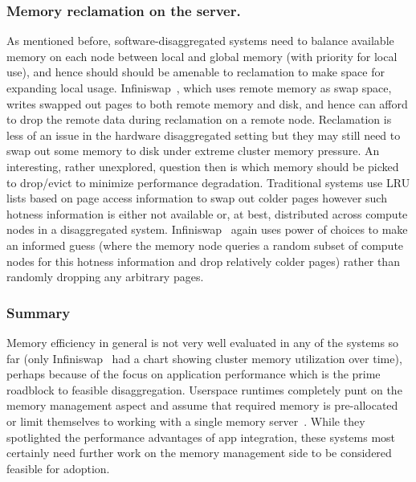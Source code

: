 \subsubsection{Memory reclamation on the server.}
As mentioned before, software-disaggregated systems need to 
balance available memory on each node between local and 
global memory (with priority for local use), and hence should 
should be amenable to reclamation to make space for expanding 
local usage. Infiniswap~\cite{infiniswap}, which 
uses remote memory as swap space, writes swapped out pages 
to both remote memory and disk, and hence can afford to drop the 
remote data during reclamation on a remote node. Reclamation is 
less of 
an issue in the hardware disaggregated setting but they may still 
need to swap out some memory to disk under extreme cluster 
memory pressure. An interesting, rather unexplored, question then
is which memory should be picked to drop/evict to minimize 
performance degradation. Traditional systems use LRU lists based 
on page access
information to swap out colder pages however such hotness information 
is either not available or, at best, distributed across 
compute nodes in a disaggregated system. 
Infiniswap~\cite{infiniswap} again uses power of choices to make an
informed guess (where the memory node queries a random subset of 
compute nodes for this hotness information and drop relatively 
colder pages) rather than randomly dropping any arbitrary pages.


\subsubsection{Summary}
Memory efficiency in general is not very well evaluated in any of 
the systems so far (only Infiniswap~\cite{infiniswap} had a chart 
showing cluster memory utilization over time), perhaps 
because of the focus on application 
performance which is the prime roadblock to feasible disaggregation.
Userspace runtimes completely punt on the memory management aspect 
and assume that required memory is pre-allocated~\cite{semeru} or 
limit themselves to working with a single memory server~\cite{aifm}. 
While they spotlighted the performance advantages of app integration, 
these systems most certainly need further work 
on the memory management side to be considered feasible for adoption. 
